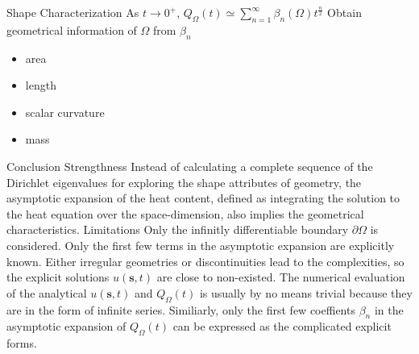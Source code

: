 \documentclass{article}
\begin{document}
\begin{outline}[enumerate]
     \3 Shape Characterization
        \4 As $t \rightarrow 0^{+}$, $Q_{\Omega}(t) \simeq \sum_{n=1}^{\infty} \beta_n(\Omega) t ^{\frac{n}{2}}$
        \4 Obtain geometrical information of $\Omega$ from $\beta_n$
         \begin{itemize}
           \item area
           \item length
           \item scalar curvature
           \item mass
         \end{itemize}
         

    \2 Conclusion
      \3 Strengthness
        \4 Instead of calculating a complete sequence of the Dirichlet eigenvalues for exploring the shape attributes of geometry, the asymptotic expansion of the heat content, defined as integrating the solution to the heat equation over the space-dimension, also implies the geometrical characteristics.  
      \3 Limitations
        \4 Only the infinitly differentiable boundary $\partial \Omega$ is considered.
        \4 Only the first few terms in the asymptotic expansion are explicitly known.
        \4 Either irregular geometries or discontinuities lead to the complexities, so the explicit solutions $u(\bm{s}, t)$ are close to non-existed.
        \4 The numerical evaluation of the analytical $u(\bm{s}, t)$ and $Q_{\Omega}(t)$ is usually by no means trivial because they are in the form of infinite series.
        \4 Similiarly, only the first few coeffients $\beta_n$ in the asymptotic expansion of $Q_{\Omega}(t)$ can be expressed as the complicated explicit forms.
        
        \newpage
        


\end{outline}
\end{document}
